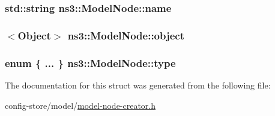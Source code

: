 \subsubsection[{\texorpdfstring{name}{name}}]{\setlength{\rightskip}{0pt plus 5cm}std\+::string ns3\+::\+Model\+Node\+::name}\hypertarget{structns3_1_1ModelNode_abede70026321b9321c75b8750f62de5f}{}\label{structns3_1_1ModelNode_abede70026321b9321c75b8750f62de5f}
\subsubsection[{\texorpdfstring{object}{object}}]{$<${\bf Object}$>$ ns3\+::\+Model\+Node\+::object}\hypertarget{structns3_1_1ModelNode_a42fe7722df2b05f9422339201e5d1a20}{}\label{structns3_1_1ModelNode_a42fe7722df2b05f9422339201e5d1a20}
\subsubsection[{\texorpdfstring{type}{type}}]{\setlength{\rightskip}{0pt plus 5cm}enum \{ ... \}   ns3\+::\+Model\+Node\+::type}\hypertarget{structns3_1_1ModelNode_abdf85277cc66a9ad43b6a568b22d9ce7}{}\label{structns3_1_1ModelNode_abdf85277cc66a9ad43b6a568b22d9ce7}


The documentation for this struct was generated from the following file\+:\begin{DoxyCompactItemize}
\item 
config-\/store/model/\hyperlink{model-node-creator_8h}{model-\/node-\/creator.\+h}\end{DoxyCompactItemize}
